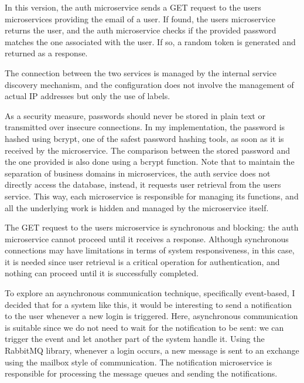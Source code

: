 \documentclass[manuscript,screen,review]{acmart}
\begin{document}
In this version, the auth microservice sends a GET request to the users microservices providing the email of a user. If found, the users microservice returns the user, and the auth microservice checks if the provided password matches the one associated with the user. If so, a random token is generated and returned as a response.

The connection between the two services is managed by the internal service discovery mechanism, and the configuration does not involve the management of actual IP addresses but only the use of labels.

As a security measure, passwords should never be stored in plain text or transmitted over insecure connections. In my implementation, the password is hashed using bcrypt, one of the safest password hashing tools, as soon as it is received by the microservice. The comparison between the stored password and the one provided is also done using a bcrypt function. Note that to maintain the separation of business domains in microservices, the auth service does not directly access the database, instead, it requests user retrieval from the users service. This way, each microservice is responsible for managing its functions, and all the underlying work is hidden and managed by the microservice itself.

The GET request to the users microservice is synchronous and blocking: the auth microservice cannot proceed until it receives a response. Although synchronous connections may have limitations in terms of system responsiveness, in this case, it is needed since user retrieval is a critical operation for authentication, and nothing can proceed until it is successfully completed.

To explore an asynchronous communication technique, specifically event-based, I decided that for a system like this, it would be interesting to send a notification to the user whenever a new login is triggered. Here, asynchronous communication is suitable since we do not need to wait for the notification to be sent: we can trigger the event and let another part of the system handle it. Using the RabbitMQ library, whenever a login occurs, a new message is sent to an exchange using the mailbox style of communication. The notification microservice is responsible for processing the message queues and sending the notifications.
\end{document}
